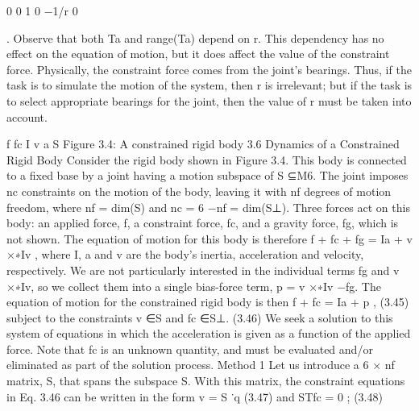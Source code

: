 0 0 1 0 −1/r 0

. Observe that both Ta and range(Ta) depend on r. This dependency has no effect on the equation of motion, but it does affect the value of the constraint force. Physically, the constraint force comes from the joint’s bearings. Thus, if the task is to simulate the motion of the system, then r is irrelevant; but if the task is to select appropriate bearings for the joint, then the value of r must be taken into account.

f fc I v a S Figure 3.4: A constrained rigid body 3.6 Dynamics of a Constrained Rigid Body Consider the rigid body shown in Figure 3.4. This body is connected to a fixed base by a joint having a motion subspace of S ⊆M6. The joint imposes nc constraints on the motion of the body, leaving it with nf degrees of motion freedom, where nf = dim(S) and nc = 6 −nf = dim(S⊥). Three forces act on this body: an applied force, f, a constraint force, fc, and a gravity force, fg, which is not shown. The equation of motion for this body is therefore f + fc + fg = Ia + v ×∗Iv , where I, a and v are the body’s inertia, acceleration and velocity, respectively. We are not particularly interested in the individual terms fg and v ×∗Iv, so we collect them into a single bias-force term, p = v ×∗Iv −fg. The equation of motion for the constrained rigid body is then f + fc = Ia + p , (3.45) subject to the constraints v ∈S and fc ∈S⊥. (3.46) We seek a solution to this system of equations in which the acceleration is given as a function of the applied force. Note that fc is an unknown quantity, and must be evaluated and/or eliminated as part of the solution process. Method 1 Let us introduce a 6 × nf matrix, S, that spans the subspace S. With this matrix, the constraint equations in Eq. 3.46 can be written in the form v = S ˙q (3.47) and STfc = 0 ; (3.48)

